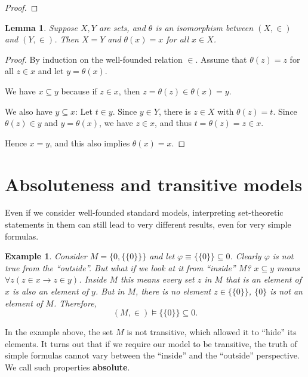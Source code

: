 \documentclass{article}
\newtheorem{lemma}[theorem]{Lemma}
\newtheorem{example}{Example}[section]
\begin{document}
\begin{proof}
\end{proof}\begin{lemma}\label{lem-mostowski-unique}Suppose $X,Y$ are sets, and ${}\theta$ is an isomorphism between $(X,\in)$ and $(Y,\in)$. Then $X=Y$ and $\theta(x) = x$ for all $x \in X$.

\end{lemma}\begin{proof}By induction on the well-founded relation $\in$. Assume that $\theta(z)=z$ for all $z \in x$ and let $y = \theta(x)$.

We have $x \subseteq y$ because if $z \in x$, then $z = \theta(z) \in \theta(x) = y$.

We also have $y \subseteq x$: Let $t \in y$. Since $y \in Y$, there is $z \in X$ with $\theta(z) = t$. Since $\theta(z) \in y$ and $y = \theta(x)$, we have $z \in x$, and thus $t = \theta(z) = z \in x$.

Hence $x = y$, and this also implies $\theta(x) = x$.

\end{proof}\section{Absoluteness and transitive models}

Even if we consider well-founded standard models, interpreting set-theoretic statements in them can still lead to very different results, even for very simple formulas.

\begin{example}Consider $M = \{0, \{\{0\}\}\}$ and let $\varphi \equiv \{\{0\}\} \subseteq 0$. Clearly ${}\varphi$ is not true from the ``outside''. But what if we look at it from ``inside'' $M$? $x \subseteq y$ means $\forall z (z \in x \to z \in y)$. \textit{Inside} $M$ this means every set $z$ \textit{in} $M$ that is an element of $x$ is also an element of $y$. But in $M$, there is no element $z \in \{\{0\}\}$, $\{0\}$ is not an element of $M$. Therefore,
\begin{equation}
(M, \in) \models \{\{0\}\} \subseteq 0.
\end{equation}

\end{example}In the example above, the set $M$ is not transitive, which allowed it to ``hide'' its elements. It turns out that if we require our model to be transitive, the truth of simple formulas cannot vary between the ``inside'' and the ``outside'' perspective. We call such properties \textbf{absolute}.
\end{document}
